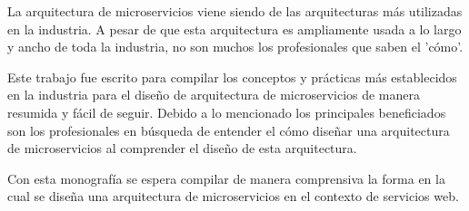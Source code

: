 
La arquitectura de microservicios viene siendo de las arquitecturas más utilizadas en la industria.
A pesar de que esta arquitectura es ampliamente usada a lo largo y ancho de toda la industria,
no son muchos los profesionales que saben el 'cómo'.

Este trabajo fue escrito para compilar los conceptos y prácticas más establecidos
en la industria para el diseño de arquitectura de microservicios de manera resumida y fácil de seguir.
Debido a lo mencionado los principales beneficiados son los profesionales en búsqueda de 
entender el cómo diseñar una arquitectura de microservicios al comprender el diseño de esta arquitectura.

Con esta monografía se espera compilar de manera comprensiva la forma en la cual se diseña
una arquitectura de microservicios en el contexto de servicios web.

\newpage
